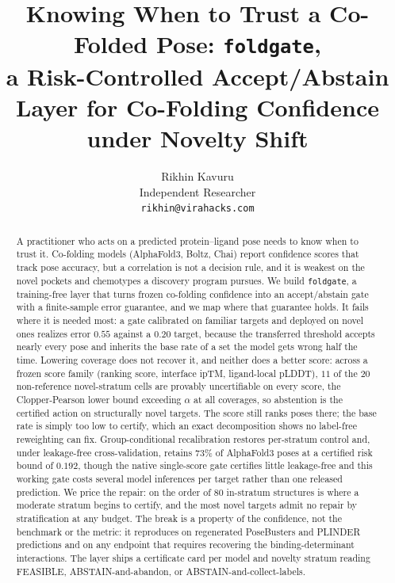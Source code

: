 \documentclass[10pt]{article}
\title{\vspace{-2.2em}\textbf{\large Knowing When to Trust a Co-Folded Pose: \texttt{foldgate},\\
a Risk-Controlled Accept/Abstain Layer for Co-Folding Confidence under Novelty Shift}}
\author{Rikhin Kavuru\\ \small Independent Researcher \\ \small \texttt{rikhin@virahacks.com}}
\date{}
\begin{document}
\maketitle
\vspace{-2.4em}

\begin{abstract}
\small
A practitioner who acts on a predicted protein--ligand pose needs to know when to trust it. Co-folding
models (AlphaFold3, Boltz, Chai) report confidence scores that track pose accuracy, but a correlation is
not a decision rule, and it is weakest on the novel pockets and chemotypes a discovery program pursues. We
build \texttt{foldgate}, a training-free layer that turns frozen co-folding confidence into an
accept/abstain gate with a finite-sample error guarantee, and we map where that guarantee holds. It fails
where it is needed most: a gate calibrated on familiar targets and deployed on novel ones realizes error
$0.55$ against a $0.20$ target, because the transferred threshold accepts nearly every pose and inherits the
base rate of a set the model gets wrong half the time. Lowering coverage does not recover it, and neither
does a better score: across a frozen score family (ranking score, interface ipTM, ligand-local pLDDT), $11$
of the $20$ non-reference novel-stratum cells are provably uncertifiable on every score, the
Clopper-Pearson lower bound exceeding $\alpha$ at all coverages, so abstention is the certified action on
structurally novel targets. The score still ranks poses there; the base rate is simply too low to certify,
which an exact decomposition shows no label-free reweighting can fix. Group-conditional recalibration
restores per-stratum control and, under leakage-free cross-validation, retains $73\%$ of AlphaFold3 poses at
a certified risk bound of $0.192$, though the native single-score gate certifies little leakage-free and
this working gate costs several model inferences per target rather than one released prediction. We price
the repair: on the order of $80$ in-stratum structures is where a moderate stratum begins to certify, and
the most novel targets admit no repair by stratification at any budget. The break is a property of the
confidence, not the benchmark or the metric: it reproduces on regenerated PoseBusters and PLINDER
predictions and on any endpoint that requires recovering the binding-determinant interactions. The layer
ships a certificate card per model and novelty stratum reading FEASIBLE, ABSTAIN-and-abandon, or
ABSTAIN-and-collect-labels.
\end{abstract}
\end{document}
